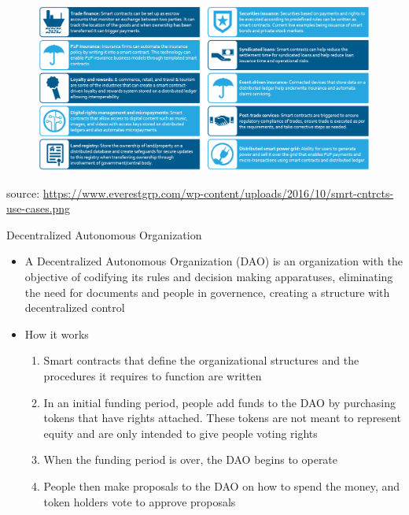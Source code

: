 \documentclass[10pt]{beamer}
\begin{document}

\begin{frame}{}
	\begin{figure}[]
		\centering
		\includegraphics  [scale=0.45]{Images/smart-use}
	\end{figure}
	\begin{scriptsize}
		source: \href{https://www.everestgrp.com/2016-10-smart-contracts-use-cases-market-insights-36265.html/}{https://www.everestgrp.com/wp-content/uploads/2016/10/smrt-cntrcts-use-cases.png}
	\end{scriptsize}
\end{frame}


\begin{frame}{Decentralized Autonomous Organization}
	\begin{itemize}
		\item A Decentralized Autonomous Organization (DAO) is an organization with the objective of codifying its rules and decision making apparatuses, eliminating the need for documents and people in governence, creating a structure with decentralized control
		\item How it works
		\begin{enumerate}
			\item Smart contracts that define the organizational structures and the procedures it requires to function are written
			\item In an initial funding period, people add funds to the DAO by purchasing tokens that have rights attached. These tokens are not meant to represent equity and are only intended to give people voting rights
			\item When the funding period is over, the DAO begins to operate
			\item People then  make proposals to the DAO on how to spend the money, and token holders vote to approve proposals
		\end{enumerate}
	\end{itemize}
\end{frame}
\end{document}
